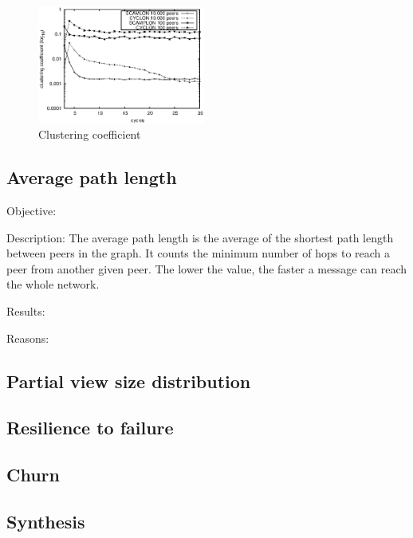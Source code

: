 \begin{figure}
    \centering
    \includegraphics[width=0.49\textwidth]{img/cluster.eps}
    \caption{Clustering coefficient}
    \label{fig:clustering}
\end{figure}

\subsection{Average path length}
\begin{asparadesc}
\item[Objective:]
\item[Description:] The average path length is the average of the shortest path
  length between peers in the graph. It counts the minimum number of hops to
  reach a peer from another given peer. The lower the value, the faster a
  message can reach the whole network.
\item[Results:]
\item[Reasons:]
\end{asparadesc}


\subsection{Partial view size distribution}

\subsection{Resilience to failure}

\subsection{Churn}

\subsection{Synthesis}

